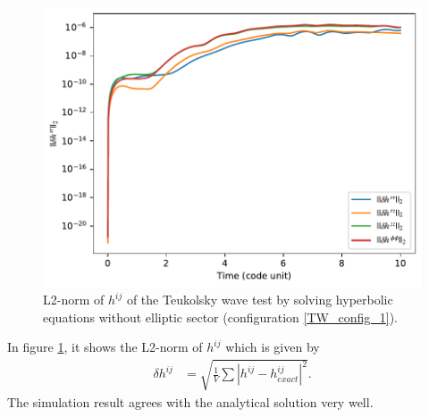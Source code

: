 \begin{figure}[h!]
\centering
  \includegraphics[width=\linewidth]{herr.pdf}
\caption{L2-norm of $h^{ij}$ of the Teukolsky wave test by solving hyperbolic equations without elliptic sector (configuration \ref{TW_config_1}).}
\label{fig:TW_h_err}
\end{figure}
In figure \ref{fig:TW_h_err},
it shows the L2-norm of $h^{ij}$ which is given by
\begin{align}
    \delta h^{ij} &= \sqrt{\frac{1}{V}\sum \left| h^{ij} - h^{ij}_{exact} \right|^2}.
\end{align}
The simulation result agrees with the analytical solution very well.
